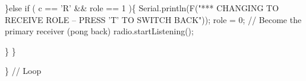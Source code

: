 \begin{DoxyCodeInclude}
   \}\textcolor{keywordflow}{else}
    \textcolor{keywordflow}{if} ( c == \textcolor{charliteral}{'R'} && role == 1 )\{
      Serial.println(F(\textcolor{stringliteral}{"*** CHANGING TO RECEIVE ROLE -- PRESS 'T' TO SWITCH BACK"}));      
       role = 0;                \textcolor{comment}{// Become the primary receiver (pong back)}
       radio.startListening();
       
    \}
  \}


\} \textcolor{comment}{// Loop}

\end{DoxyCodeInclude}
 